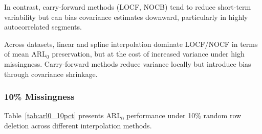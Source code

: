 In contrast, carry-forward methods (\ac{LOCF}, \ac{NOCB}) tend to reduce short-term variability but can bias covariance estimates downward, particularly in highly autocorrelated segments.

Across datasets, linear and spline interpolation dominate LOCF/NOCF in terms of mean \ac{ARL}$_0$ preservation, but at the cost of increased variance under high missingness. Carry-forward methods reduce variance locally but introduce bias through covariance shrinkage.

\subsubsection{10\% Missingness}

Table~\ref{tab:arl0_10pct} presents \ac{ARL}$_0$ performance under 10\% random row deletion across different interpolation methods. 

